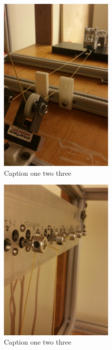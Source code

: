 \begin{figure}[loadcells_pulley]
  \label{fig:loadcells_pulley}
  \centering
  \includegraphics[width=0.5\textwidth]{figures/loadcells_pulley.pdf}
  \caption{Caption one two three}
\end{figure}
\begin{figure}[motor_closeup]
  \label{fig:motor_closeup}
  \centering
  \includegraphics[width=0.5\textwidth]{figures/motor_closeup.pdf}
  \caption{Caption one two three}
\end{figure}
